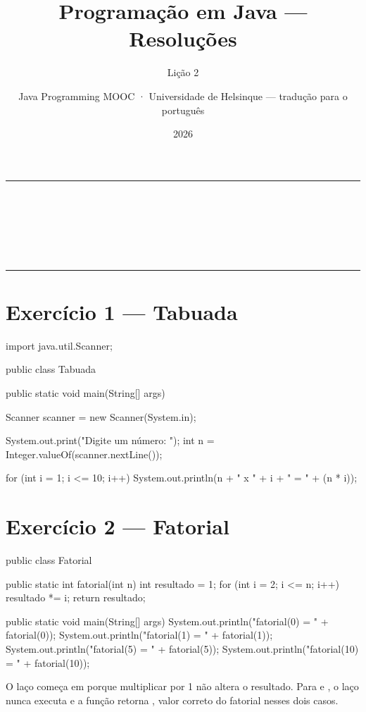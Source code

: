 \documentclass[11pt,a4paper]{article}
\title{Programação em Java — Resoluções}
\subtitle{Lição 2}
\author{Java Programming MOOC · Universidade de Helsinque — tradução para o português}
\date{2026}
\makeatletter
\renewcommand{\maketitle}{%
  \begin{center}
    {\color{javaRule}\rule{\linewidth}{1pt}}\\[6pt]
    {\Huge\sffamily\bfseries\color{javaOrange} \@title}\\[6pt]
    \ifx\@subtitle\undefined\else
      {\Large\sffamily\color{javaDeep} \@subtitle}\\[4pt]
    \fi
    {\small\sffamily\color{gray} \@author}\\[2pt]
    {\small\sffamily\color{gray} \@date}\\[6pt]
    {\color{javaRule}\rule{\linewidth}{1pt}}
  \end{center}
  \vspace{1em}
}
\makeatother
\begin{document}
\maketitle
\tableofcontents
\vspace{1.5em}

\section{Exercício 1 --- Tabuada}

\begin{javacode}
import java.util.Scanner;

public class Tabuada {
    public static void main(String[] args) {
        Scanner scanner = new Scanner(System.in);

        System.out.print("Digite um número: ");
        int n = Integer.valueOf(scanner.nextLine());

        for (int i = 1; i <= 10; i++) {
            System.out.println(n + " x " + i + " = " + (n * i));
        }
    }
}
\end{javacode}

\section{Exercício 2 --- Fatorial}

\begin{javacode}
public class Fatorial {

    public static int fatorial(int n) {
        int resultado = 1;
        for (int i = 2; i <= n; i++) {
            resultado *= i;
        }
        return resultado;
    }

    public static void main(String[] args) {
        System.out.println("fatorial(0) = " + fatorial(0));
        System.out.println("fatorial(1) = " + fatorial(1));
        System.out.println("fatorial(5) = " + fatorial(5));
        System.out.println("fatorial(10) = " + fatorial(10));
    }
}
\end{javacode}

\begin{destaque}
O laço começa em  porque multiplicar por 1 não altera o resultado. Para  e , o laço nunca executa e a função retorna , valor correto do fatorial nesses dois casos.
\end{destaque}
\end{document}
